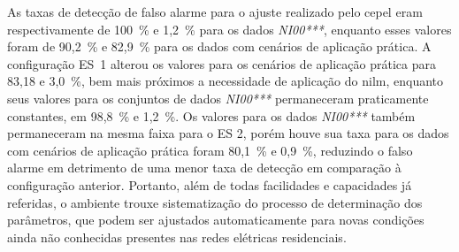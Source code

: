 As taxas de detecção de falso alarme para o ajuste realizado pelo
\acs{cepel} eram respectivamente de 100~\% e 1,2~\% para os dados
\emph{NI00***}, enquanto esses valores foram de 90,2~\% e 82,9~\% para
os dados com cenários de aplicação prática. A configuração ES~1
alterou os valores para os cenários de aplicação prática para 83,18 e
3,0~\%, bem mais próximos a necessidade de aplicação do \acs{nilm},
enquanto seus valores para os conjuntos de dados \emph{NI00***}
permaneceram praticamente constantes, em 98,8~\% e 1,2~\%. Os valores
para os dados \emph{NI00***} também permaneceram na mesma faixa para
o ES 2, porém houve sua taxa para os dados com cenários de aplicação
prática foram 80,1~\% e 0,9~\%, reduzindo o falso alarme em detrimento
de uma menor taxa de detecção em comparação à configuração anterior.
Portanto, além de todas facilidades e capacidades já referidas, o
ambiente trouxe sistematização do processo de determinação dos
parâmetros, que podem ser ajustados automaticamente para novas
condições ainda não conhecidas presentes nas redes elétricas
residenciais. 

%


